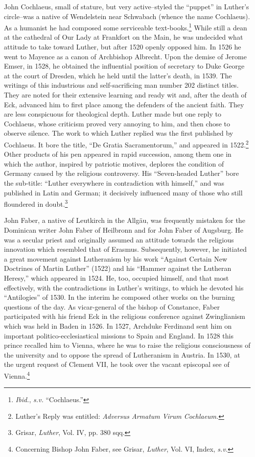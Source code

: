 John Cochlaeus, small of stature, but very active--styled the “puppet”
in Luther’s circle--was a native of Wendelstein near Schwabach
(whence the name Cochlaeus). As a humanist he had composed some
serviceable text-books.\footnote{\textit{Ibid.}, \textit{s.v.} “Cochlaeus.”}
While still a dean at the cathedral of Our
Lady at Frankfort on the Main, he was undecided what attitude to
take toward Luther, but after 1520 openly opposed him. In 1526 he
went to Mayence as a canon of Archbishop Albrecht. Upon the
demise of Jerome Emser, in 1528, he obtained the influential position
of secretary to Duke George at the court of Dresden, which he held
until the latter’s death, in 1539. The writings of this industrious and
self-sacrificing man number 202 distinct titles. They are noted for
their extensive learning and ready wit and, after the death of Eck,
advanced him to first place among the defenders of the ancient faith.
They are less conspicuous for theological depth. Luther made but one
reply to Cochlaeus, whose criticism proved very annoying to him,
and then chose to observe silence. The work to which Luther replied
was the first published by Cochlaeus. It bore the title, “De Gratia
Sacramentorum,” and appeared in 1522.\footnote
{Luther’s Reply was entitled: \textit{Adversus Armatum Virum Cochlaeum.}}
Other products of his pen
appeared in rapid succession, among them one in which the author,
inspired by patriotic motives, deplores the condition of Germany
caused by the religious controversy. His “Seven-headed Luther” bore
the sub-title: “Luther everywhere in contradiction with himself,”
and was published in Latin and German; it decisively influenced many
of those who still floundered in doubt.\footnote
{Grisar, \textit{Luther}, Vol. IV, pp. 380 sqq.}

John Faber, a native of Leutkirch in the Allgäu, was frequently
mistaken for the Dominican writer John Faber of Heilbronn and
for John Faber of Augsburg. He was a secular priest and originally
assumed an attitude towards the religious innovation which resembled
that of Erasmus. Subsequently, however, he initiated a great movement against
Lutheranism by his work “Against Certain New Doctrines of Martin Luther”
(1522) and his “Hammer against the Lutheran Heresy,” which appeared in
1524. He, too, occupied himself,
and that most effectively, with the contradictions in Luther’s writings,
to which he devoted his “Antilogies” of 1530. In the interim he composed
other works on the burning questions of the day. As vicar-general of the
bishop of Constance, Faber participated with his friend
Eck in the religious conference against Zwinglianism which was held
in Baden in 1526. In 1527, Archduke Ferdinand sent him on important politico-ecclesiastical
missions to Spain and England. In 1528
this prince recalled him to Vienna, where he was to raise the religious
consciousness of the university and to oppose the spread of Lutheranism
in Austria. In 1530, at the urgent request of Clement VII, he
took over the vacant episcopal see of Vienna.\footnote
{Concerning Bishop John Faber, see Grisar, \textit{Luther}, Vol. VI, Index, \textit{s.v.}}


